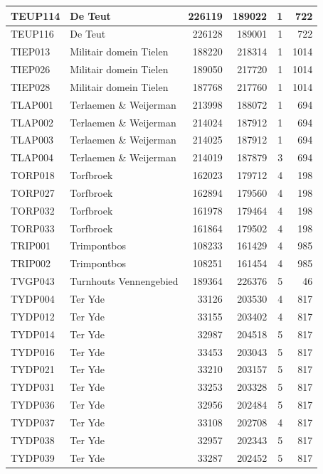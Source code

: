 \documentclass[11pt,]{book}
\begin{document}
\begin{table}
\begin{tabular}[t]{l|l|r|r|r|r}
\hline
TEUP114 & De Teut & 226119 & 189022 & 1 & 722\\
\hline
TEUP116 & De Teut & 226128 & 189001 & 1 & 722\\
\hline
TIEP013 & Militair domein Tielen & 188220 & 218314 & 1 & 1014\\
\hline
TIEP026 & Militair domein Tielen & 189050 & 217720 & 1 & 1014\\
\hline
TIEP028 & Militair domein Tielen & 187768 & 217760 & 1 & 1014\\
\hline
TLAP001 & Terlaemen \& Weijerman & 213998 & 188072 & 1 & 694\\
\hline
TLAP002 & Terlaemen \& Weijerman & 214024 & 187912 & 1 & 694\\
\hline
TLAP003 & Terlaemen \& Weijerman & 214025 & 187912 & 1 & 694\\
\hline
TLAP004 & Terlaemen \& Weijerman & 214019 & 187879 & 3 & 694\\
\hline
TORP018 & Torfbroek & 162023 & 179712 & 4 & 198\\
\hline
TORP027 & Torfbroek & 162894 & 179560 & 4 & 198\\
\hline
TORP032 & Torfbroek & 161978 & 179464 & 4 & 198\\
\hline
TORP033 & Torfbroek & 161864 & 179502 & 4 & 198\\
\hline
TRIP001 & Trimpontbos & 108233 & 161429 & 4 & 985\\
\hline
TRIP002 & Trimpontbos & 108251 & 161454 & 4 & 985\\
\hline
TVGP043 & Turnhouts Vennengebied & 189364 & 226376 & 5 & 46\\
\hline
TYDP004 & Ter Yde & 33126 & 203530 & 4 & 817\\
\hline
TYDP012 & Ter Yde & 33155 & 203402 & 4 & 817\\
\hline
TYDP014 & Ter Yde & 32987 & 204518 & 5 & 817\\
\hline
TYDP016 & Ter Yde & 33453 & 203043 & 5 & 817\\
\hline
TYDP021 & Ter Yde & 33210 & 203157 & 5 & 817\\
\hline
TYDP031 & Ter Yde & 33253 & 203328 & 5 & 817\\
\hline
TYDP036 & Ter Yde & 32956 & 202484 & 5 & 817\\
\hline
TYDP037 & Ter Yde & 33108 & 202708 & 4 & 817\\
\hline
TYDP038 & Ter Yde & 32957 & 202343 & 5 & 817\\
\hline
TYDP039 & Ter Yde & 33287 & 202452 & 5 & 817\\
\hline

\end{tabular}
\end{table}
\end{document}

